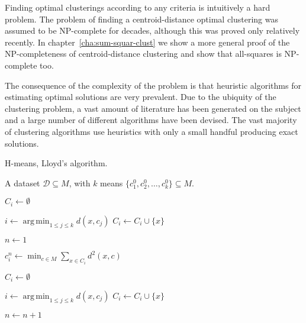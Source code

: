\documentclass[a4paper]{report}
\DeclareMathOperator*{\argmin}{arg\,min}
\newcommand{\dset}{\mathcal{D}}
\begin{document}
Finding optimal clusterings according to any criteria is intuitively a hard
problem.  The problem of finding a centroid-distance optimal clustering was
assumed to be NP-complete for decades, although this was proved only
relatively recently\citep{aloise09exact}.  In
chapter~\ref{cha:sum-squar-clust} we show a more general proof of the
NP-completeness of centroid-distance clustering and show that all-squares is
NP-complete too.

The consequence of the complexity of the problem is that heuristic algorithms
for estimating optimal solutions are very prevalent.  Due to the ubiquity of
the clustering problem, a vast amount of literature has been generated on the
subject and a large number of different algorithms have been devised.  The
vast majority of clustering algorithms use heuristics with only a small
handful producing exact solutions.

\begin{algorithm}
  \caption{H-means, Lloyd's algorithm.}
  \label{alg:lloyds}
  
  \begin{algorithmic}
    \Require A dataset $\dset \subseteq M$, with $k$ means
    $\{c^0_1,c^0_2,\dotsc,c^0_k\} \subseteq M$.

       \State $C_i \gets \emptyset$
    \EndFor

    \ForAll{$x \in \dset$}
       \State $i \gets \argmin_{1 \leq j \leq k} d(x,c_j)$
       \State $C_i \gets C_i \cup \{x\}$
    \EndFor

    \State $n \gets 1$

    \Repeat
       
          \State $c^n_i \gets \min_{c \in M} \sum_{x \in C_i} d^2(x,c)$
       \EndFor

          \State $C_i \gets \emptyset$
       \EndFor
       
       \ForAll{$x \in \dset$}
          \State $i \gets \argmin_{1 \leq j \leq k} d(x,c_j)$
          \State $C_i \gets C_i \cup \{x\}$
       \EndFor

       \State $n \gets n+1$
       

          
       \State {}
  \end{algorithmic}
\end{algorithm}
\end{document}

